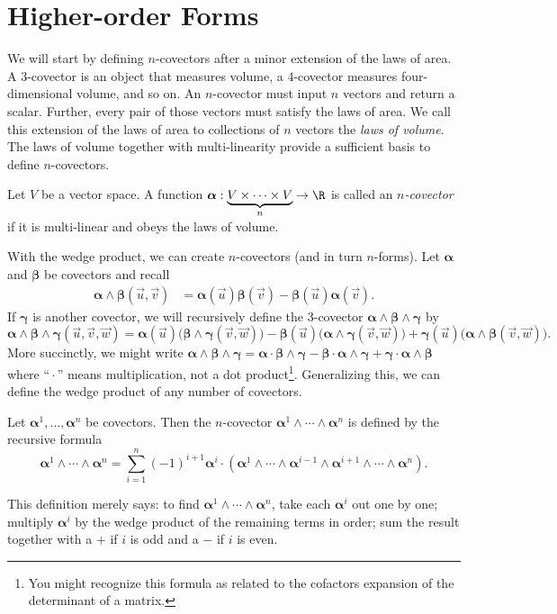 \section{Higher-order Forms}

We will start by defining $n$-covectors after a minor extension
of the laws of area.  A $3$-covector is an object that measures
volume, a $4$-covector measures four-dimensional volume, and so on.
An $n$-covector must input $n$ vectors and return a scalar.  Further,
every pair of those vectors must satisfy the laws of area.  We call this extension
of the laws of area to collections of $n$ vectors the \emph{laws of volume}.  The laws of volume together with multi-linearity provide a sufficient
basis to define $n$-covectors.

\begin{definition}[$n$-covector]
	Let $V$ be a vector space.
	A function $\bm\alpha:\underbrace{V\times \cdots \times V}_{n}
	\to \R$ is called an \emph{$n$-covector} if it is multi-linear
	and obeys the laws
	of volume. 
\end{definition}

With the wedge product, we can create $n$-covectors (and in turn
$n$-forms).  Let $\bm\alpha$ and $\bm \beta$ be covectors and recall
\begin{align*}
	\bm\alpha\wedge \bm\beta (\vec u,\vec v) &= \bm\alpha(\vec u)\bm\beta(\vec v)
	-\bm\beta(\vec u)\bm\alpha(\vec v).
\end{align*}
If $\bm\gamma$ is another covector, we will recursively define the 3-covector
$\bm\alpha \wedge \bm \beta\wedge\bm\gamma$ by
\[
	\bm\alpha \wedge \bm \beta\wedge\bm\gamma(\vec u,\vec v,\vec w)
	=  \bm\alpha(\vec u)\big(\bm\beta\wedge \bm\gamma (\vec v,\vec w)\big)
	- \bm\beta(\vec u)\big(\bm\alpha\wedge \bm\gamma (\vec v,\vec w)\big)
	+ \bm\gamma(\vec u)\big(\bm\alpha\wedge \bm\beta (\vec v,\vec w)\big).
\]
More succinctly, we might write
$
	\bm\alpha \wedge \bm \beta\wedge\bm\gamma
	=  \bm\alpha\cdot \bm\beta\wedge \bm\gamma
	- \bm\beta\cdot \bm\alpha\wedge \bm\gamma
	+ \bm\gamma\cdot \bm\alpha\wedge \bm\beta
$ where ``\,$\cdot$\,'' means multiplication, not a dot product\footnote{
You might recognize this formula as related to the cofactors expansion
of the determinant of a matrix.
}.  Generalizing this, we can define the wedge product of any number
of covectors.

\begin{definition}
	Let $\bm\alpha^1,\ldots, \bm\alpha^n$ be covectors.  Then the
	$n$-covector $\bm\alpha^1\wedge\cdots \wedge \bm\alpha^n$ is defined by
	the recursive formula
	\[
		\bm\alpha^1\wedge\cdots \wedge \bm\alpha^n
		=\sum_{i=1}^n (-1)^{i+1} \bm\alpha^i\cdot (\bm\alpha^1\wedge \cdots \wedge 
		\bm\alpha^{i-1}\wedge \bm\alpha^{i+1}\wedge \cdots \wedge \bm\alpha^n).
	\]
\end{definition}
This definition merely says: to find $\bm\alpha^1\wedge\cdots \wedge \bm\alpha^n$,
take each $\bm\alpha^i$ out one by one; multiply $\bm\alpha^i$ by the wedge
product of the remaining terms in order; sum the result together with a $+$
if $i$ is odd and a $-$ if $i$ is even.

